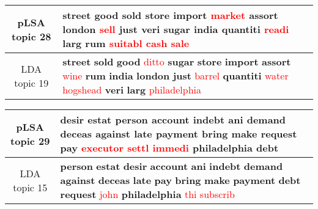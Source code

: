 \begin{center}\begin{tabularx}{\textwidth} {
  | c | >{\raggedright\arraybackslash}X | } \hline 
pLSA topic 28 & \textbf{street} \textbf{good} \textbf{sold} \textbf{store} \textbf{import} \textcolor{red}{market} \textbf{assort} \textbf{london} \textcolor{red}{sell} \textbf{just} \textbf{veri} \textbf{sugar} \textbf{india} \textbf{quantiti} \textcolor{red}{readi} \textbf{larg} \textbf{rum} \textcolor{red}{suitabl} \textcolor{red}{cash} \textcolor{red}{sale} \\ \hline 
LDA topic 19 & \textbf{street} \textbf{sold} \textbf{good} \textcolor{red}{ditto} \textbf{sugar} \textbf{store} \textbf{import} \textbf{assort} \textcolor{red}{wine} \textbf{rum} \textbf{india} \textbf{london} \textbf{just} \textcolor{red}{barrel} \textbf{quantiti} \textcolor{red}{water} \textcolor{red}{hogshead} \textbf{veri} \textbf{larg} \textcolor{red}{philadelphia} \\ \hline 
\end{tabularx}

\end{center}

\begin{center}\begin{tabularx}{\textwidth} {
  | c | >{\raggedright\arraybackslash}X | } \hline 
pLSA topic 29 & \textbf{desir} \textbf{estat} \textbf{person} \textbf{account} \textbf{indebt} \textbf{ani} \textbf{demand} \textbf{deceas} \textbf{against} \textbf{late} \textbf{payment} \textbf{bring} \textbf{make} \textbf{request} \textbf{pay} \textcolor{red}{executor} \textcolor{red}{settl} \textcolor{red}{immedi} \textbf{philadelphia} \textbf{debt} \\ \hline 
LDA topic 15 & \textbf{person} \textbf{estat} \textbf{desir} \textbf{account} \textbf{ani} \textbf{indebt} \textbf{demand} \textbf{against} \textbf{deceas} \textbf{late} \textbf{pay} \textbf{bring} \textbf{make} \textbf{payment} \textbf{debt} \textbf{request} \textcolor{red}{john} \textbf{philadelphia} \textcolor{red}{thi} \textcolor{red}{subscrib} \\ \hline 
\end{tabularx}

\end{center}

